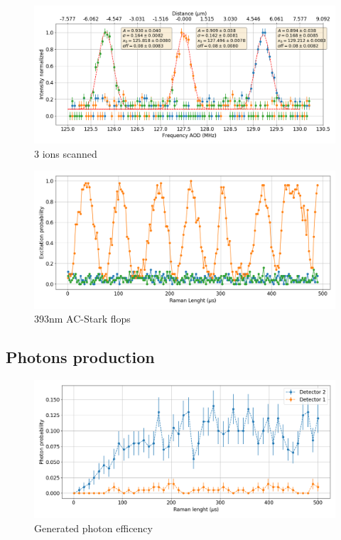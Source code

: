 \begin{figure}[H]
\centering
\includegraphics[width=\textwidth]{img/AODscan}
\caption{3 ions scanned}
\end{figure}
\begin{figure}[H]
\centering
\includegraphics[width=\textwidth]{img/ac_stark}
\caption{393nm AC-Stark flops}
\end{figure}

\subsection{Photons production}
\begin{figure}[H]
\centering
\includegraphics[width=\textwidth]{img/photonefficency_witherror}
\caption{Generated photon efficency}
\end{figure}

